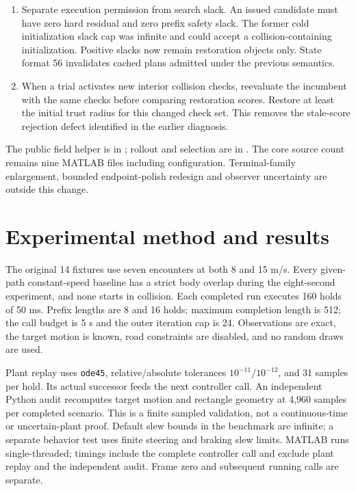 \documentclass[11pt]{article}
\begin{document}
\begin{enumerate}
flow seeds; a raw state infinity-norm discrepancy threshold of $10^{-4}$
only controls this search choice. Smaller discrepancies still revalidate and
repair the retained plan; they are not ignored by safety admission.
\item Separate execution permission from search slack. An issued candidate
must have zero hard residual and zero prefix safety slack. The former cold
initialization slack cap was infinite and could accept a collision-containing
initialization. Positive slacks now remain restoration objects only. State
format 56 invalidates cached plans admitted under the previous semantics.
\item When a trial activates new interior collision checks, reevaluate the
incumbent with the same checks before comparing restoration scores. Restore
at least the initial trust radius for this changed check set. This removes
the stale-score rejection defect identified in the earlier diagnosis.
\end{enumerate}

The public field helper is in ;
rollout and selection are in .
The core source count remains nine MATLAB files including configuration.
Terminal-family enlargement, bounded endpoint-polish redesign and observer
uncertainty are outside this change.

\section{Experimental method and results}
The original 14 fixtures use seven encounters at both 8 and 15 m/s. Every
given-path constant-speed baseline has a strict body overlap during the
eight-second experiment, and none starts in collision. Each completed run
executes 160 holds of 50 ms. Prefix lengths are 8 and 16 holds; maximum
completion length is 512; the call budget is 5 s and the outer iteration cap
is 24. Observations are exact, the target motion is known, road constraints
are disabled, and no random draws are used.

Plant replay uses \texttt{ode45}, relative/absolute tolerances
$10^{-11}/10^{-12}$, and 31 samples per hold. Its actual successor feeds the
next controller call. An independent Python audit recomputes target motion
and rectangle geometry at 4,960 samples per completed scenario. This is a
finite sampled validation, not a continuous-time or uncertain-plant proof.
Default slew bounds in the benchmark are infinite; a separate behavior test
uses finite steering and braking slew limits. MATLAB runs single-threaded;
timings include the complete controller call and exclude plant replay and
the independent audit. Frame zero and subsequent running calls are separate.
\end{document}
